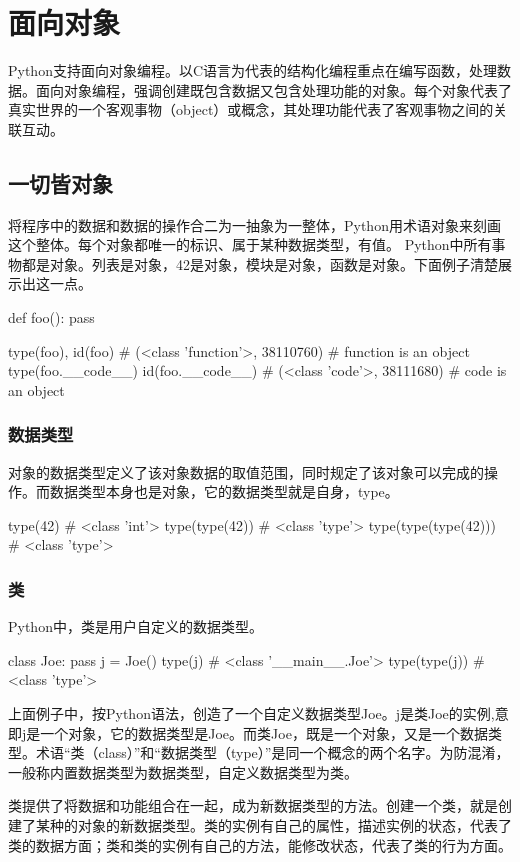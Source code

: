 \chapter{面向对象}
Python支持面向对象编程。以C语言为代表的结构化编程重点在编写函数，处理数据。面向对象编程，强调创建既包含数据又包含处理功能的对象。每个对象代表了真实世界的一个客观事物（object）或概念，其处理功能代表了客观事物之间的关联互动。

\section{一切皆对象}
将程序中的数据和数据的操作合二为一抽象为一整体，Python用术语对象来刻画这个整体。每个对象都唯一的标识、属于某种数据类型，有值。
Python中所有事物都是对象。列表是对象，42是对象，模块是对象，函数是对象。下面例子清楚展示出这一点。
\begin{python}
def foo(): pass

type(foo), id(foo)
# (<class 'function'>, 38110760)   #  function is an object
type(foo.__code__)
id(foo.__code__)
# (<class 'code'>, 38111680)  #  code is an object
\end{python}
\subsection{数据类型}
对象的数据类型定义了该对象数据的取值范围，同时规定了该对象可以完成的操作。而数据类型本身也是对象，它的数据类型就是自身，type。
\begin{python}
type(42)
#  <class 'int'>
type(type(42))
#  <class 'type'>
type(type(type(42)))
#  <class 'type'>
\end{python}
\subsection{类}
Python中，类是用户自定义的数据类型。
\begin{python}
class Joe: 
    pass
j = Joe()
type(j)
# <class '__main__.Joe'>
type(type(j))
# <class 'type'>
\end{python}
上面例子中，按Python语法，创造了一个自定义数据类型Joe。j是类Joe的实例,意即j是一个对象，它的数据类型是Joe。而类Joe，既是一个对象，又是一个数据类型。术语“类（class）”和“数据类型（type）”是同一个概念的两个名字。为防混淆，一般称内置数据类型为数据类型，自定义数据类型为类。

类提供了将数据和功能组合在一起，成为新数据类型的方法。创建一个类，就是创建了某种的对象的新数据类型。类的实例有自己的属性，描述实例的状态，代表了类的数据方面；类和类的实例有自己的方法，能修改状态，代表了类的行为方面。
